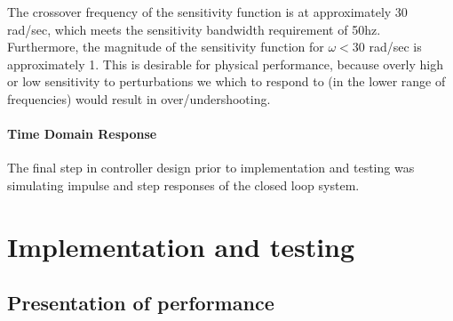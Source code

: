 \documentclass[11pt, a4paper,twocolumn]{article}
\begin{document}
			The crossover frequency of the sensitivity function is at approximately 30 rad/sec, which meets the sensitivity bandwidth requirement of 50hz. Furthermore, the magnitude of the sensitivity function for $ \omega < 30 $ rad/sec is approximately 1. This is desirable for physical performance, because overly high or low sensitivity to perturbations we which to respond to (in the lower range of frequencies) would result in over/undershooting.
			
			
	\paragraph{		Time Domain Response		}
			The final step in controller design prior to implementation and testing was simulating impulse and step responses of the closed loop system. 
	
    \section{Implementation and testing}\label{sec:test}
        \subsection{Presentation of performance}\label{subsec:performance}
\end{document}

